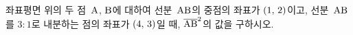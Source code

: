 좌표평면 위의 두 점~$\mathrm{A}$, $\mathrm{B}$에 대하여 선분~$\mathrm{AB}$의 중점의 좌표가 $(1,\mkern3mu 2)$이고, 선분~$\mathrm{AB}$를 $3:1$로 내분하는 점의 좌표가 $(4,\mkern3mu 3)$일 때, $\overline{\mathrm{AB}}^2$의 값을 구하시오.
